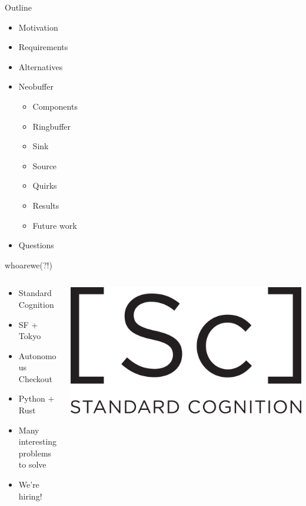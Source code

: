 \documentclass[aspectratio=43]{beamer}
\begin{document}
\begin{frame}{Outline}
    \begin{itemize}
        \item Motivation
        \item Requirements
        \item Alternatives
        \item Neobuffer
            \begin{itemize}
                \item Components
                \item Ringbuffer
                \item Sink
                \item Source
                \item Quirks
                \item Results
                \item Future work
            \end{itemize}
        \item Questions
    \end{itemize}
\end{frame}

\begin{frame}{whoarewe(?!)}
    \begin{columns}[T]
        \begin{column}{.5\textwidth}
            \begin{itemize}
                \item Standard Cognition
                \item SF + Tokyo
                \item Autonomous Checkout
                \item Python + Rust
                \item Many interesting problems to solve
                \item We're hiring!
            \end{itemize}
        \end{column}
        \begin{column}{.5\textwidth}
            \includegraphics[width=\textwidth]{./imgs/sc-logo.png}
        \end{column}
    \end{columns}
\end{frame}
\end{document}
